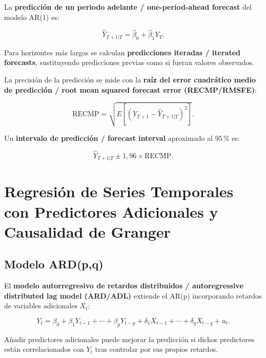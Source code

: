 \documentclass[12pt]{article}
\begin{document}
La \textbf{predicci\'on de un periodo adelante / one-period-ahead forecast} del modelo AR(1) es:

\begin{equation}
  \widehat{Y}_{T+1|T} = \hat{\beta}_0 + \hat{\beta}_1 Y_T.
\end{equation}

Para horizontes m\'as largos se calculan \textbf{predicciones iteradas / iterated forecasts}, sustituyendo predicciones previas como si fueran valores observados.

La precisi\'on de la predicci\'on se mide con la \textbf{ra\'iz del error cuadr\'atico medio de predicci\'on / root mean squared forecast error (RECMP/RMSFE)}:

\begin{equation}
  \text{RECMP} = \sqrt{E\!\left[\left(Y_{T+1} - \widehat{Y}_{T+1|T}\right)^2\right]}.
\end{equation}

Un \textbf{intervalo de predicci\'on / forecast interval} aproximado al 95\,\% es:

\begin{equation}
  \widehat{Y}_{T+1|T} \pm 1{,}96 \times \text{RECMP}.
\end{equation}

\section{Regresi\'on de Series Temporales con Predictores Adicionales y Causalidad de Granger}

\subsection{Modelo ARD(p,q)}

El \textbf{modelo autorregresivo de retardos distribuidos / autoregressive distributed lag model (ARD/ADL)} extiende el AR(p) incorporando retardos de variables adicionales $X_t$:

\begin{equation}
  Y_t = \beta_0 + \beta_1 Y_{t-1} + \cdots + \beta_p Y_{t-p}
        + \delta_1 X_{t-1} + \cdots + \delta_q X_{t-q} + u_t.
\end{equation}

Añadir predictores adicionales puede mejorar la predicci\'on si dichos predictores est\'an correlacionados con $Y_t$ tras controlar por sus propios retardos.
\end{document}
